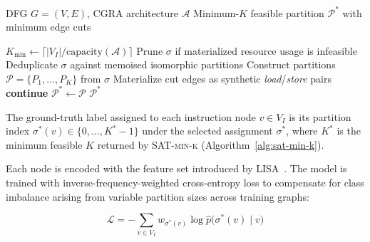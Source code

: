 \documentclass[runningheads]{llncs}
\begin{document}
\begin{algorithm}
\caption{\textsc{SAT-min-k} Partitioning}\label{alg:sat-min-k}
\begin{algorithmic}
\Require DFG $G = (V, E)$, CGRA architecture $\mathcal{A}$
\Ensure Minimum-$K$ feasible partition $\mathcal{P}^*$ with minimum edge cuts

\State $K_{\min} \leftarrow \lceil |V_I| / \text{capacity}(\mathcal{A}) \rceil$ 
        \State Prune $\sigma$ if materialized resource usage is infeasible 
        \State Deduplicate $\sigma$ against memoised isomorphic partitions 
        \State Construct partitions $\mathcal{P} = \{P_1, \ldots, P_K\}$ from $\sigma$
        \State Materialize cut edges as synthetic \textit{load}/\textit{store} pairs
            \State \textbf{continue}
        \EndIf
                \State $\mathcal{P}^* \leftarrow \mathcal{P}$ 
            \EndIf
        \EndIf
    \EndFor
        \State \Return $\mathcal{P}^*$ 
    \EndIf
\EndFor
\end{algorithmic}
\end{algorithm}

The ground-truth label assigned to each instruction node $v \in V_I$ is its partition index $\sigma^*(v) \in \{0, \ldots, K^*-1\}$ under the selected assignment $\sigma^*$, where $K^*$ is the minimum feasible $K$ returned by \textsc{SAT-min-k} (Algorithm~\ref{alg:sat-min-k}).

Each node is encoded with the feature set introduced by LISA~\cite{9773209}.
The model is trained with inverse-frequency-weighted cross-entropy loss to compensate for class imbalance arising from variable partition sizes across training graphs:

\begin{equation}
    \mathcal{L} = -\sum_{v \in V_I} w_{\sigma^*(v)} \log \hat{p}\bigl(\sigma^*(v) \mid v\bigr)
    \label{eq:loss}
\end{equation}
\end{document}
